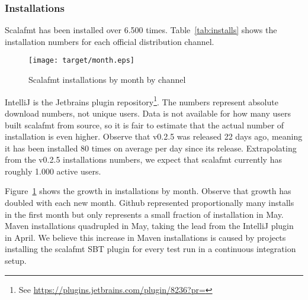 \subsubsection{Installations}
Scalafmt has been installed over 6.500 times.
  Table~\ref{tab:installs} shows the installation numbers for each official distribution channel.
  \begin{figure}
    \CenterFloatBoxes
    \begin{floatrow}
      \ffigbox
      {\texttt{[image: target/month.eps]}}
      {\caption{Scalafmt installations by month by channel}\label{fig:installs}}
      \killfloatstyle
    \end{floatrow}
  \end{figure}
IntelliJ is the Jetbrains plugin repository\footnote{
  See \url{https://plugins.jetbrains.com/plugin/8236?pr=}
}.
The numbers represent absolute download numbers, not unique users.
Data is not available for how many users built scalafmt from source, so it is fair to estimate that the actual number of installation is even higher.
Observe that v0.2.5 was released 22 days ago, meaning it has been installed 80 times on average per day since its release.
Extrapolating from the v0.2.5 installations numbers, we expect that scalafmt currently has roughly 1.000 active users.

Figure~\ref{fig:installs} shows the growth in installations by month.
Observe that growth has doubled with each new month.
Github represented proportionally many installs in the first month but only represents a small fraction of installation in May.
Maven installations quadrupled in May, taking the lead from the IntelliJ plugin in April.
We believe this increase in Maven installations is caused by projects installing the scalafmt SBT plugin for every test run in a continuous integration setup.


